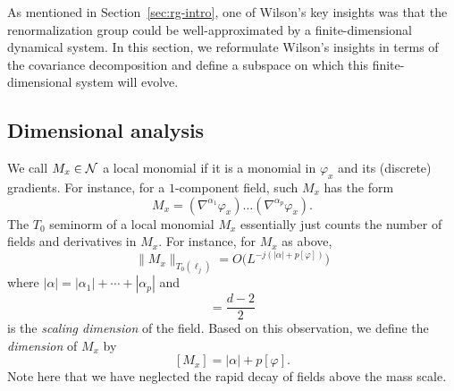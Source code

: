 As mentioned in Section~\ref{sec:rg-intro}, one of Wilson's key insights was that the renormalization
group could be well-approximated by a finite-dimensional dynamical system. In this
section, we reformulate Wilson's insights in terms of the covariance decomposition
and define a subspace on which this finite-dimensional system will evolve.



\subsection{Dimensional analysis}
\label{sec:dimensional}

We call $M_x \in \mathcal{N}$ a local monomial if it is a monomial in $\varphi_x$ and its
(discrete) gradients. For instance, for a $1$-component field, such $M_x$ has the form
\begin{equation}
\label{e:field-mon}
M_x = (\nabla^{\alpha_1} \varphi_x) \ldots (\nabla^{\alpha_p} \varphi_x).
\end{equation}
The $T_0$ seminorm of a local monomial $M_x$ essentially
just counts the number of fields and derivatives in $M_x$. For instance, for $M_x$
as above,
\begin{equation}
\|M_x\|_{T_0(\ell_j)}
	=
O\big(L^{-j (|\alpha| + p [\varphi])}\big)
\end{equation}
where $|\alpha| = |\alpha_1| + \cdots + |\alpha_p|$ and
\begin{equation}
[\varphi] = \frac{d - 2}{2}
\end{equation}
is the \emph{scaling dimension} of the field.
Based on this observation, we define the
\emph{dimension} of $M_x$ by
\begin{equation}
\label{e:mon-dim}
[M_x] = |\alpha| + p [\varphi].
\end{equation}
Note here that we have neglected the rapid decay of fields above the mass scale.


